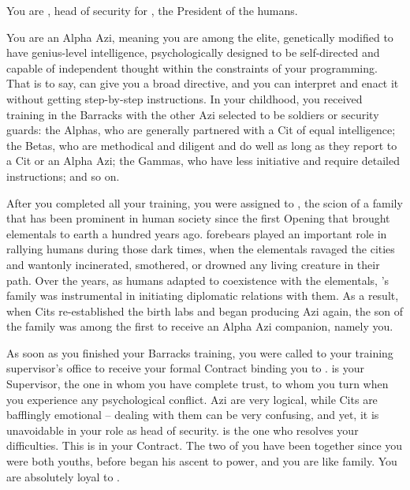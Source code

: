 \documentclass[char]{elementals}
\begin{document}
\name{\cRomeo{}}

You are \cRomeo{\intro}, head of security for \cLeader{\intro}, the President of the humans.

You are an Alpha Azi, meaning you are among the elite, genetically modified to have genius-level intelligence, psychologically designed to be self-directed and capable of independent thought within the constraints of your programming.  That is to say, \cLeader{} can give you a broad directive, and you can interpret and enact it without getting step-by-step instructions.  In your childhood, you received training in the Barracks with the other Azi selected to be soldiers or security guards: the Alphas, who are generally partnered with a Cit of equal intelligence; the Betas, who are methodical and diligent and do well as long as they report to a Cit or an Alpha Azi; the Gammas, who have less initiative and require detailed instructions; and so on.

After you completed all your training, you were assigned to \cLeader{}, the scion of a family that has been prominent in human society since the first Opening that brought elementals to earth a hundred years ago.  \cLeader{\Their} forebears played an important role in rallying humans during those dark times, when the elementals ravaged the cities and wantonly incinerated, smothered, or drowned any living creature in their path.  Over the years, as humans adapted to coexistence with the elementals, \cLeader{}'s family was instrumental in initiating diplomatic relations with them.  As a result, when Cits re-established the birth labs and began producing Azi again, the son of the \cLeader{\formal} family was among the first to receive an Alpha Azi companion, namely you.

As soon as you finished your Barracks training, you were called to your training supervisor's office to receive your formal Contract binding you to \cLeader{}.  \cLeader{\They} is your Supervisor, the one in whom you have complete trust, to whom you turn when you experience any psychological conflict.  Azi are very logical, while Cits are bafflingly emotional -- dealing with them can be very confusing, and yet, it is unavoidable in your role as head of security.  \cLeader{} is the one who resolves your difficulties.  This is in your Contract.  The two of you have been together since you were both youths, before \cLeader{\they} began his ascent to power, and you are like family.  You are absolutely loyal to \cLeader{\them}.
\end{document}
